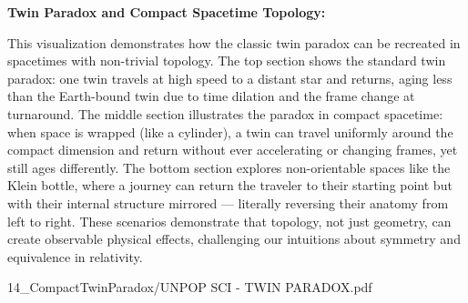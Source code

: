 \begin{SideNotePage}{
  \textbf{Twin Paradox and Compact Spacetime Topology:} \par
  This visualization demonstrates how the classic twin paradox can be recreated in spacetimes with non-trivial topology. The top section shows the standard twin paradox: one twin travels at high speed to a distant star and returns, aging less than the Earth-bound twin due to time dilation and the frame change at turnaround. The middle section illustrates the paradox in compact spacetime: when space is wrapped (like a cylinder), a twin can travel uniformly around the compact dimension and return without ever accelerating or changing frames, yet still ages differently. The bottom section explores non-orientable spaces like the Klein bottle, where a journey can return the traveler to their starting point but with their internal structure mirrored — literally reversing their anatomy from left to right. These scenarios demonstrate that topology, not just geometry, can create observable physical effects, challenging our intuitions about symmetry and equivalence in relativity.
}{14_CompactTwinParadox/UNPOP SCI - TWIN PARADOX.pdf}
\end{SideNotePage}

